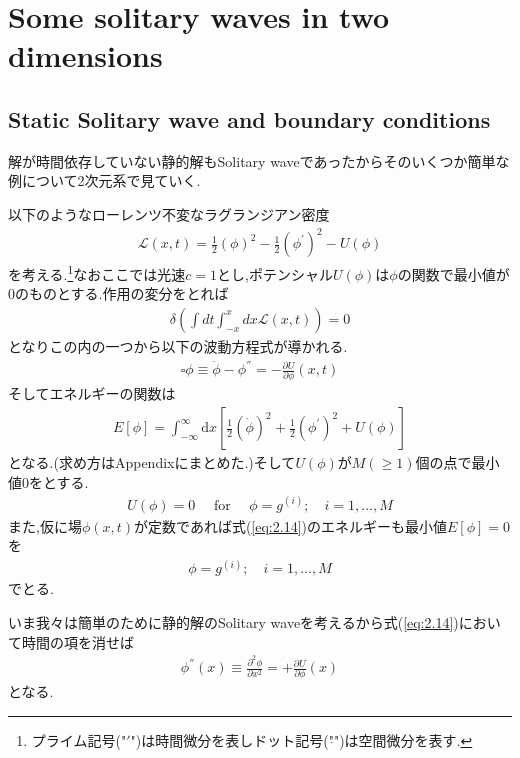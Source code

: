 \documentclass[dvipdfmx,11pt,a4paper,oneside,openany]{jsbook}
\begin{document}
\section{Some solitary waves in two dimensions}
\subsection{Static Solitary wave and boundary conditions}
解が時間依存していない静的解もSolitary waveであったからそのいくつか簡単な例について2次元系で見ていく.

以下のようなローレンツ不変なラグランジアン密度
\begin{align}
    \mathscr{L}(x, t)=\frac{1}{2}(\phi)^{2}-\frac{1}{2}\left(\phi^{'}\right)^{2}-U(\phi)
\end{align}
を考える.\footnote{プライム記号("$'$")は時間微分を表しドット記号("$\dot{ }$")は空間微分を表す.}なおここでは光速$c=1$とし,ポテンシャル$U(\phi)$は$\phi$の関数で最小値が0のものとする.作用の変分をとれば
\begin{align}
    \delta\left(\int dt \int_{-x}^{x}dx\mathscr{L}(x,t)\right)=0
\end{align}
となりこの内の一つから以下の波動方程式が導かれる.
\begin{align}
    \square \phi \equiv \ddot{\phi}-\phi^{''}=-\frac{\partial U}{\partial \phi}(x, t)\label{eq:2.13}
\end{align}
そしてエネルギーの関数は
\begin{align}
    E[\phi]=\int_{-\infty}^{\infty} \mathrm{d} x\left[\frac{1}{2}(\dot{\phi})^{2}+\frac{1}{2}\left(\phi^{'}\right)^{2}+U(\phi)\right]\label{eq:2.14}
\end{align}
となる.(求め方はAppendixにまとめた.)そして$U(\phi)$が$M(\geq1)$個の点で最小値0をとする.
\begin{align}
    U(\phi)=0 \quad \text { for } \quad \phi=g^{(i)} ; \quad i=1, \ldots, M\label{eq:2.15}
\end{align}
また,仮に場$\phi(x,t)$が定数であれば式(\ref{eq:2.14})のエネルギーも最小値$E[\phi]=0$を
\begin{align}
    \phi=g^{(i)} ; \quad i=1, \ldots, M
\end{align}
でとる.

いま我々は簡単のために静的解のSolitary waveを考えるから式(\ref{eq:2.14})において時間の項を消せば
\begin{align}
    \phi^{''}(x) \equiv \frac{\partial^{2} \phi}{\partial x^{2}}=+\frac{\partial U}{\partial \phi}(x)\label{eq:2.17}
\end{align}
となる.
\end{document}
